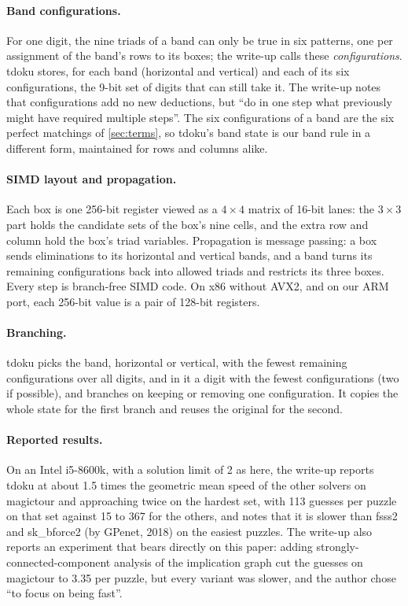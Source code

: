 \documentclass[11pt]{article}
\theoremstyle{definition}
\theoremstyle{plain}
\begin{document}
\paragraph{Band configurations.} For one digit, the nine triads of a band can only be true in six patterns, one per
assignment of the band's rows to its boxes; the write-up calls these \emph{configurations}. tdoku stores, for each band
(horizontal and vertical) and each of its six configurations, the 9-bit set of digits that can still take it. The
write-up notes that configurations add no new deductions, but ``do in one step what previously might have required
multiple steps''. The six configurations of a band are the six perfect matchings of \cref{sec:terms}, so tdoku's band
state is our band rule in a different form, maintained for rows and columns alike.

\paragraph{SIMD layout and propagation.} Each box is one 256-bit register viewed as a $4\times 4$ matrix of 16-bit
lanes: the $3\times 3$ part holds the candidate sets of the box's nine cells, and the extra row and column hold the box's triad variables. Propagation is message passing: a box sends eliminations to its horizontal and vertical bands, and a band
turns its remaining configurations back into allowed triads and restricts its three boxes. Every step is branch-free
SIMD code. On x86 without AVX2, and on our ARM port, each 256-bit value is a pair of 128-bit registers.

\paragraph{Branching.} tdoku picks the band, horizontal or vertical, with the fewest remaining configurations over all
digits, and in it a digit with the fewest configurations (two if possible), and branches on keeping or removing one
configuration. It copies the whole state for the first branch and reuses the original for the second.

\paragraph{Reported results.} On an Intel i5-8600k, with a solution limit of 2 as here, the write-up reports tdoku at
about 1.5 times the geometric mean speed of the other solvers on magictour and approaching twice on the hardest set,
with 113 guesses per puzzle on that set against 15 to 367 for the others, and notes that it is slower than fsss2 and
sk\_bforce2 (by GPenet, 2018) on the easiest puzzles. The write-up also reports an experiment that bears directly on
this paper: adding strongly-connected-component analysis of the implication graph cut the guesses on magictour to 3.35
per puzzle, but every variant was slower, and the author chose ``to focus on being fast''.
\end{document}

